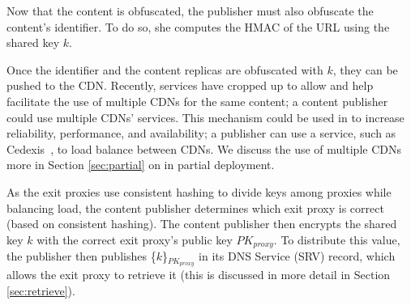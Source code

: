 Now that the content is obfuscated, the publisher must also obfuscate the content's identifier.  To do so, 
she computes the HMAC of the URL using the shared key $k$.

Once the identifier and the content replicas are obfuscated with $k$, they can be pushed to the 
CDN.  Recently, services have cropped up to allow and help facilitate the use of multiple CDNs for the same content; a content 
publisher could use multiple CDNs' services.  This mechanism could be used in \system{} to increase reliability, 
performance, and availability; a publisher can use a service, such as Cedexis~\cite{cedexis}, to load balance between 
CDNs.  We discuss the use of multiple CDNs more in Section \ref{sec:partial} on \system{} in 
partial deployment.  %

As the exit proxies use consistent hashing to divide keys among proxies while balancing load, the content publisher
determines which exit proxy is correct (based on consistent hashing).  The content publisher then encrypts the 
shared key $k$ with the correct exit proxy's public key $PK_{proxy}$.  To distribute this value, the publisher 
then publishes \{$k$\}$_{PK_{proxy}}$ in its DNS Service (SRV) record, which allows the exit proxy to retrieve it (this is discussed in more 
detail in Section \ref{sec:retrieve}).


